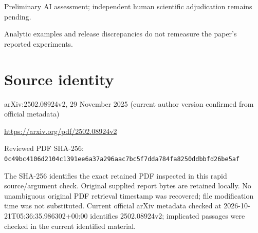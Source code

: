 \documentclass[11pt]{article}
\begin{document}
Preliminary AI assessment; independent human scientific adjudication remains pending.\par

Analytic examples and release discrepancies do not remeasure the paper’s reported experiments.\par

\section*{Source identity}

arXiv:2502.08924v2, 29 November 2025 (current author version confirmed from official metadata)

\url{https://arxiv.org/pdf/2502.08924v2}

Reviewed PDF SHA-256: \nolinkurl{0c49bc4106d2104c1391ee6a37a296aac7bc5f7dda784fa8250ddbbfd26be5af}

The SHA-256 identifies the exact retained PDF inspected in this rapid source/argument check. Original supplied report bytes are retained locally. No unambiguous original PDF retrieval timestamp was recovered; file modification time was not substituted. Current official arXiv metadata checked at 2026-10-21T05:36:35.986302+00:00 identifies 2502.08924v2; implicated passages were checked in the current identified material.
\end{document}
